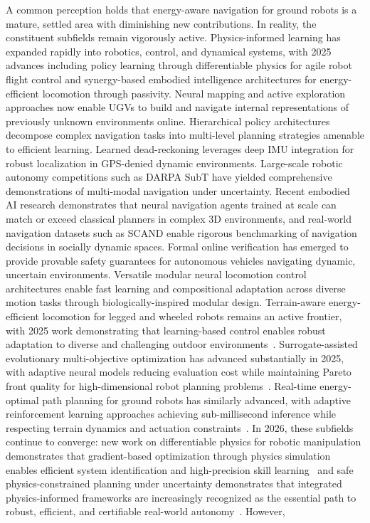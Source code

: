 \documentclass[pdflatex,sn-nature]{sn-jnl}%
\begin{document}
A common perception holds that energy-aware navigation for ground robots is a mature, settled area with diminishing new contributions. In reality, the constituent subfields remain vigorously active. Physics-informed learning has expanded rapidly into robotics, control, and dynamical systems\cite{Cuomo2022,Wang2021grad,Wang2024causal,Antonelo2024,Lutter2019,Cranmer2020,kadambi2023incorporating,rao2023encoding,huang2023self,li2024learning}, with 2025 advances including policy learning through differentiable physics for agile robot flight control\cite{zhang2025learning} and synergy-based embodied intelligence architectures for energy-efficient locomotion through passivity\cite{stella2025synergy}. Neural mapping and active exploration approaches now enable UGVs to build and navigate internal representations of previously unknown environments online\cite{Chaplot2020}. Hierarchical policy architectures decompose complex navigation tasks into multi-level planning strategies amenable to efficient learning\cite{Nachum2018}. Learned dead-reckoning leverages deep IMU integration for robust localization in GPS-denied dynamic environments\cite{Herath2020,Brossard2020imu}. Large-scale robotic autonomy competitions such as DARPA SubT have yielded comprehensive demonstrations of multi-modal navigation under uncertainty\cite{Agha2022nebula}. Recent embodied AI research demonstrates that neural navigation agents trained at scale can match or exceed classical planners in complex 3D environments\cite{Wijmans2020}, and real-world navigation datasets such as SCAND\cite{Karnan2022scand} enable rigorous benchmarking of navigation decisions in socially dynamic spaces. Formal online verification has emerged to provide provable safety guarantees for autonomous vehicles navigating dynamic, uncertain environments\cite{pek2020using}. Versatile modular neural locomotion control architectures enable fast learning and compositional adaptation across diverse motion tasks through biologically-inspired modular design\cite{thor2022versatile}. Terrain-aware energy-efficient locomotion for legged and wheeled robots remains an active frontier, with 2025 work demonstrating that learning-based control enables robust adaptation to diverse and challenging outdoor environments~\cite{Kim2025highspeed}. Surrogate-assisted evolutionary multi-objective optimization has advanced substantially in 2025, with adaptive neural models reducing evaluation cost while maintaining Pareto front quality for high-dimensional robot planning problems~\cite{Si2025surrogate}. Real-time energy-optimal path planning for ground robots has similarly advanced, with adaptive reinforcement learning approaches achieving sub-millisecond inference while respecting terrain dynamics and actuation constraints~\cite{GAO20251}. In 2026, these subfields continue to converge: new work on differentiable physics for robotic manipulation demonstrates that gradient-based optimization through physics simulation enables efficient system identification and high-precision skill learning~\cite{Yang2026ddbot} and safe physics-constrained planning under uncertainty demonstrates that integrated physics-informed frameworks are increasingly recognized as the essential path to robust, efficient, and certifiable real-world autonomy~\cite{Manzinger2025reachable}. However, 
\end{document}
